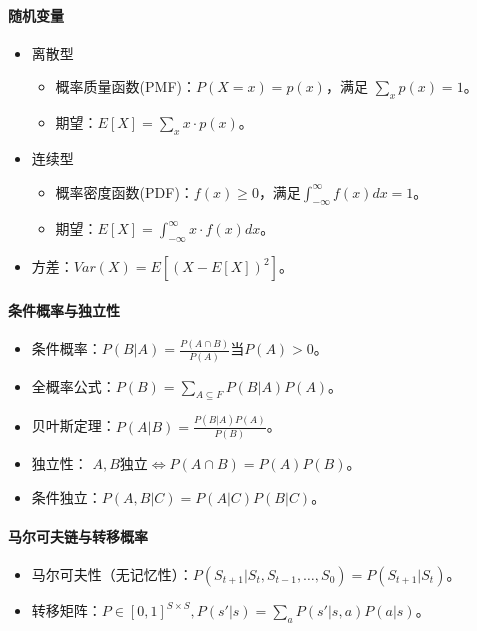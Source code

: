 \documentclass[
12pt, %
a4paper, 
oneside, %
headinclude,footinclude, %
]{scrartcl}
\begin{document}
\paragraph{随机变量}
\begin{itemize}
\item 离散型
\begin{itemize}
\item 概率质量函数(PMF)：$ P(X = x) = p(x) $，满足 $ \sum_{x} p(x) = 1 $。
\item 期望：$ E[X] = \sum_{x} x \cdot p(x) $。
\end{itemize}
\item 连续型
\begin{itemize}
\item 概率密度函数(PDF)：$ f(x) \geq 0 $，满足$ \int_{-\infty}^{\infty} f(x) dx = 1 $。
\item 期望：$ E[X] = \int_{-\infty}^{\infty} x \cdot f(x) dx $。
\end{itemize}
\item 方差：$ Var(X) = E[(X - E[X])^2] $。
\end{itemize}
\paragraph{条件概率与独立性}
\begin{itemize}
\item 条件概率：$ P(B|A) = \frac{P(A \cap B)}{P(A)}$当$ P(A) > 0 $。
\item 全概率公式：$ P(B) = \sum_{A \subseteq F} P(B|A) P(A) $。
\item 贝叶斯定理：$ P(A|B) = \frac{P(B|A) P(A)}{P(B)} $。
\item 独立性： $ A,B $独立$ \iff P(A \cap B) = P(A)P(B) $。
\item 条件独立：$ P(A ,B|C) = P(A|C)P(B|C) $。
\end{itemize}
\paragraph{马尔可夫链与转移概率}
\begin{itemize}
\item 马尔可夫性（无记忆性）：$ P(S_{t + 1}|S_t, S_{t - 1}, \dots, S_0) = P(S_{t + 1}|S_t) $。
\item 转移矩阵：$ P \in [0, 1]^{S \times S}, P(s'|s) = \sum_{a} P(s'|s, a) P(a|s) $。
\end{itemize}
\end{document}
